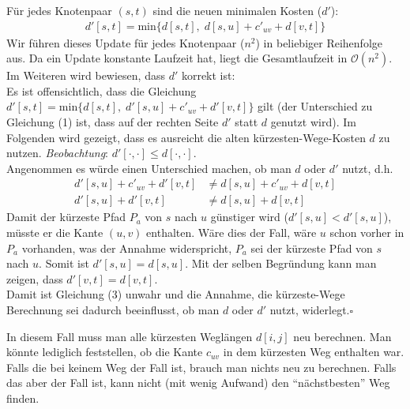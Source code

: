 \documentclass[11pt]{scrartcl} %
\begin{document}
\begin{compactenum}[(a)]
\item Für jedes Knotenpaar $(s,t)$ sind die neuen minimalen Kosten ($d'$):
\begin{align}
    d'[s,t] = \text{min}\{d[s,t],\; d[s,u] + c'_{uv} + d[v,t]\}
\end{align}
Wir führen dieses Update für jedes Knotenpaar ($n^2$) in beliebiger Reihenfolge aus. Da ein Update konstante Laufzeit hat, liegt die Gesamtlaufzeit in $\mathcal O(n^2)$. Im Weiteren wird bewiesen, dass $d'$ korrekt ist:\\[0.3cm]
Es ist offensichtlich, dass die Gleichung $d'[s,t] = \text{min}\{d[s,t],\; d'[s,u] + c'_{uv} + d'[v,t]\}$ gilt (der Unterschied zu Gleichung (1) ist, dass auf der rechten Seite $d'$ statt $d$ genutzt wird). Im Folgenden wird gezeigt, dass es ausreicht die alten kürzesten-Wege-Kosten $d$ zu nutzen. \emph{Beobachtung}: $d'[\cdot,\cdot] \le d[\cdot,\cdot]$.\\
Angenommen es würde einen Unterschied machen, ob man $d$ oder $d'$ nutzt, d.h.
\begin{align}
    d'[s,u] + c'_{uv} + d'[v,t] &\ne d[s,u] + c'_{uv} + d[v,t]\\
    d'[s,u] + d'[v,t] &\ne d[s,u] + d[v,t]
\end{align}
Damit der kürzeste Pfad $P_a$ von $s$ nach $u$ günstiger wird ($d'[s,u] < d'[s,u]$), müsste er die Kante $(u,v)$ enthalten. Wäre dies der Fall, wäre $u$ schon vorher in $P_a$ vorhanden, was der Annahme widerspricht, $P_a$ sei der kürzeste Pfad von $s$ nach $u$. Somit ist $d'[s,u] = d[s,u]$. Mit der selben Begründung kann man zeigen, dass $d'[v,t] = d[v,t]$.\\[0.3cm]
Damit ist Gleichung (3) unwahr und die Annahme, die kürzeste-Wege Berechnung sei dadurch beeinflusst, ob man $d$ oder $d'$ nutzt, widerlegt.\hfill $\square$\\

\item In diesem Fall muss man alle kürzesten Weglängen $d[i,j]$ neu berechnen. Man könnte lediglich feststellen, ob die Kante $c_{uv}$ in dem kürzesten Weg enthalten war. Falls die bei keinem Weg der Fall ist, brauch man nichts neu zu berechnen. Falls das aber der Fall ist, kann nicht (mit wenig Aufwand) den \enquote{nächstbesten} Weg finden.



\end{compactenum}
\end{document}
